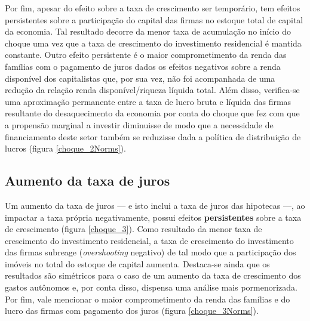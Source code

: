 Por fim, apesar do efeito sobre a taxa de crescimento ser temporário, tem efeitos persistentes sobre a participação do capital das firmas no estoque total de capital da economia. Tal resultado decorre da menor taxa de acumulação no início do choque uma vez que a taxa de crescimento do investimento residencial é mantida constante. 
Outro efeito persistente é o maior comprometimento da renda das famílias com o pagamento de juros dados os efeitos negativos sobre a renda disponível dos capitalistas que, por sua vez, não foi acompanhada de uma redução da relação renda disponível/riqueza líquida total.
Além disso, verifica-se uma aproximação permanente entre a taxa de lucro bruta e líquida das firmas resultante do desaquecimento da economia por conta do choque que fez com que a propensão marginal a investir diminuisse de modo que a necessidade de financiamento deste setor também se reduzisse dada a política de distribuição de lucros (figura \ref{choque_2Norms}).

\subsection*{Aumento da taxa de juros}

Um aumento da taxa de juros  --- e isto inclui a taxa de juros das hipotecas ---, ao impactar a taxa própria negativamente, possui efeitos \textbf{persistentes} sobre a taxa de crescimento (figura \ref{choque_3}). Como resultado da menor taxa de crescimento do investimento residencial, a taxa de crescimento do investimento das firmas subreage (\textit{overshooting} negativo) de tal modo que a participação dos imóveis no total do estoque de capital aumenta. 
Destaca-se ainda que os resultados são simétricos para o caso de um aumento da taxa de crescimento dos gastos autônomos e, por conta disso, dispensa uma análise mais pormenorizada.
Por fim, vale mencionar o maior comprometimento da renda das famílias e do lucro das firmas com pagamento dos juros (figura \ref{choque_3Norms}). 


